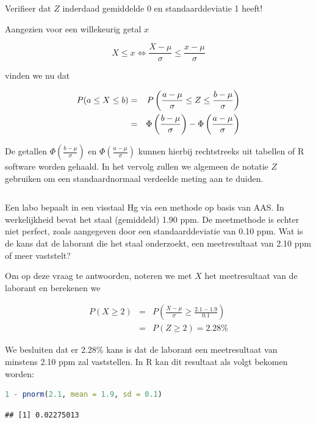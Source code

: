 \documentclass[
  12pt,dutch,coursenotes]{book}
\begin{document}
Verifieer dat \(Z\) inderdaad gemiddelde 0 en standaarddeviatie 1 heeft!

Aangezien voor een willekeurig getal \(x\)

\begin{equation*}
X\leq x \Leftrightarrow \frac{X-\mu}{\sigma} \leq \frac{x-\mu}{\sigma}
\end{equation*}

vinden we nu dat

\begin{eqnarray*}
P(a \leq X \leq b) & = & P\left(\frac{a-\mu}{\sigma} \leq Z \leq \frac{b-\mu%
}{\sigma} \right) \\
& = & \Phi \left (\frac{b-\mu}{\sigma} \right ) - \Phi \left (\frac{a-\mu}{%
\sigma} \right )
\end{eqnarray*}

De getallen \(\Phi \left (\frac{b-\mu}{\sigma} \right )\) en \(\Phi \left (\frac{a-\mu}{\sigma} \right )\) kunnen hierbij rechtstreeks uit tabellen of R software worden gehaald. In het vervolg zullen we
algemeen de notatie \(Z\) gebruiken om een standaardnormaal verdeelde meting
aan te duiden.

\begin{lstlisting}
\end{lstlisting}

Een labo bepaalt in een visstaal Hg via een methode op basis van AAS. In
werkelijkheid bevat het staal (gemiddeld) 1.90 ppm. De meetmethode is echter
niet perfect, zoals aangegeven door een standaarddeviatie van 0.10 ppm. Wat
is de kans dat de laborant die het staal onderzoekt, een meetresultaat van
2.10 ppm of meer vaststelt?

Om op deze vraag te antwoorden, noteren we met \(X\) het meetresultaat van de
laborant en berekenen we

\begin{eqnarray*}
P(X\geq 2)&=&P\left(\frac{X-\mu}{\sigma}\geq \frac{2.1-1.9}{0.1}\right) \\
&=&P(Z\geq 2) = 2.28\%
\end{eqnarray*}

We besluiten dat er 2.28\% kans is dat de laborant een meetresultaat van
minstens 2.10 ppm zal vaststellen. In R kan dit resultaat als volgt bekomen worden:

\begin{lstlisting}[language=R]
1 - pnorm(2.1, mean = 1.9, sd = 0.1)
\end{lstlisting}

\begin{lstlisting}
## [1] 0.02275013
\end{lstlisting}
\end{document}
